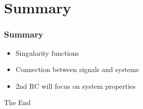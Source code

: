 \documentclass{beamer}
\begin{document}
\section{Summary}
\begin{frame}
    \frametitle{Summary}
    \begin{itemize}
        \item Singularity functions
        \item Connection between signals and systems
        \item 2nd RC will focus on system properties
        
    \end{itemize}
    
\end{frame}


\begin{frame}
\Huge{\centerline{The End}}
\end{frame}

\end{document}
